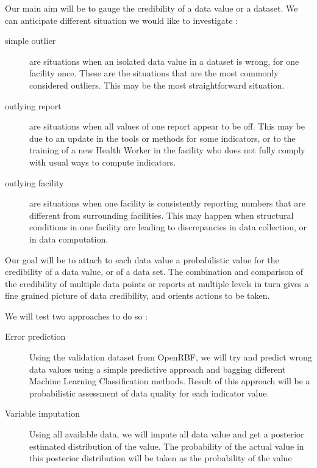 Our main aim will be to gauge the credibility of a data value or a dataset.  We can anticipate different situation we would like to investigate :
\begin{description}
\item[simple outlier] are situations when an isolated data value in a dataset is wrong, for one facility once. These are the situations that are the most commonly considered outliers. This may be the most straightforward situation.
\item[outlying report] are situations when all values of one report appear to be off. This may be due to an update in the tools or methods for some indicators, or to the training of a new Health Worker in the facility who does not fully comply with usual ways to compute indicators.
\item[outlying facility] are situations when one facility is consistently reporting numbers that are different from surrounding facilities. This may happen when structural conditions in one facility are leading to discrepancies in data collection, or in data computation.
\end{description}

Our goal will be to attach to each data value a probabilistic value for the credibility of a data value, or of a data set. The combination and comparison of the credibility of multiple data points or reports at multiple levels in turn gives a fine grained picture of data credibility, and orients actions to be taken.


We will test two approaches to do so :

\begin{description}
\item[Error prediction] Using the validation dataset from OpenRBF, we will try and predict wrong data values using a simple predictive approach and bagging different Machine Learning Classification methods. Result of this approach will be a probabilistic assessment of data quality for each indicator value.
\item[Variable imputation] Using all available data, we will impute all data value and get a posterior estimated distribution of the value. The probability of the actual value in this posterior distribution will be taken as the probability of the value
\end{description}


